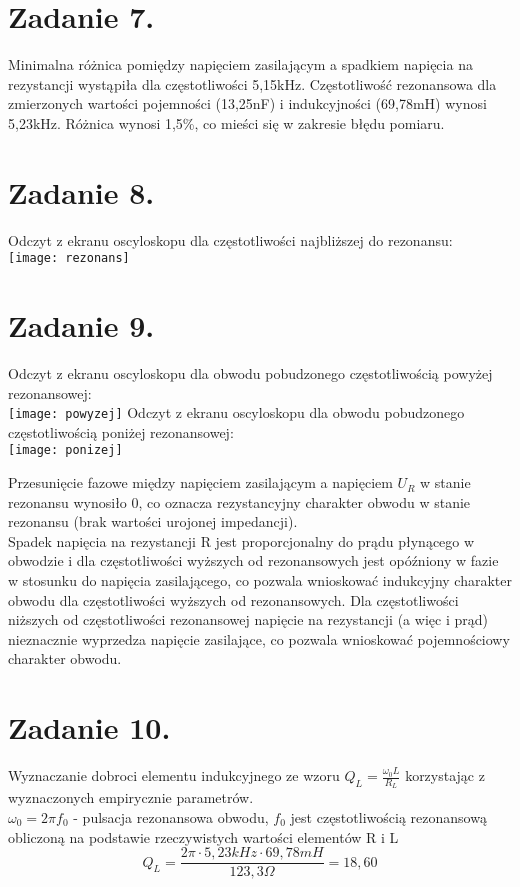 \documentclass[polish,a4paper]{article}
\begin{document}
\section{Zadanie 7.}
Minimalna różnica pomiędzy napięciem zasilającym a spadkiem napięcia na rezystancji wystąpiła dla częstotliwości 5,15kHz. Częstotliwość rezonansowa dla zmierzonych wartości pojemności (13,25nF) i indukcyjności (69,78mH) wynosi 5,23kHz. Różnica wynosi 1,5\%, co mieści się w zakresie błędu pomiaru.

\section{Zadanie 8.}
Odczyt z ekranu oscyloskopu dla częstotliwości najbliższej do rezonansu:\\
\texttt{[image: rezonans]}

\section{Zadanie 9.}
Odczyt z ekranu oscyloskopu dla obwodu pobudzonego częstotliwością powyżej rezonansowej:\\
\texttt{[image: powyzej]}
\newpage
Odczyt z ekranu oscyloskopu dla obwodu pobudzonego częstotliwością poniżej rezonansowej:\\
\texttt{[image: ponizej]}

Przesunięcie fazowe między napięciem zasilającym a napięciem $U_R$ w stanie rezonansu wynosiło 0, co oznacza rezystancyjny charakter obwodu w stanie rezonansu (brak wartości urojonej impedancji).\\
Spadek napięcia na rezystancji R jest proporcjonalny do prądu płynącego w obwodzie i dla częstotliwości wyższych od rezonansowych jest opóźniony w fazie w stosunku do napięcia zasilającego, co pozwala wnioskować indukcyjny charakter obwodu dla częstotliwości wyższych od rezonansowych.
Dla częstotliwości niższych od częstotliwości rezonansowej napięcie na rezystancji (a więc i prąd) nieznacznie wyprzedza napięcie zasilające, co pozwala wnioskować pojemnościowy charakter obwodu.

\section{Zadanie 10.}
Wyznaczanie dobroci elementu indukcyjnego ze wzoru $Q_{L} = \frac{\omega_{0}L}{R_{L}}$ korzystając z wyznaczonych empirycznie parametrów.\\
$\omega_{0}=2\pi f_{0}$ - pulsacja rezonansowa obwodu, $f_{0}$ jest częstotliwością rezonansową obliczoną na podstawie rzeczywistych wartości elementów R i L
$$
Q_{L} = \frac{2\pi\cdot5,23kHz\cdot69,78mH}{123,3\Omega} = 18,60
$$
\end{document}
